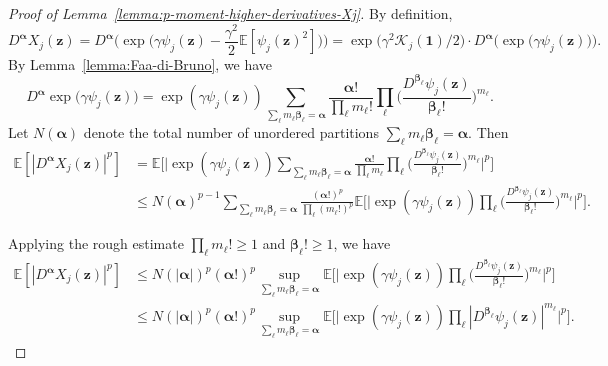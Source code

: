 \documentclass[12pt]{amsart}
\theoremstyle{definition}
\theoremstyle{remark}
\newcommand{\bz}{\boldsymbol{z}}
\newcommand{\E}{\mathbb{E}}
\numberwithin{equation}{section}
\begin{document}
\begin{proof}[Proof of Lemma~\ref{lemma:p-moment-higher-derivatives-Xj}]
By definition,
\[
D^{\boldsymbol{\alpha}} X_j(\bz)=D^{\boldsymbol{\alpha}}\Big(\exp\big(\gamma \psi_j(\bz)-\frac{\gamma^2}{2}\E[\psi_j(\bz)^2]\big)\Big)=\exp\big(\gamma^2 \mathcal{K}_j(\boldsymbol{1})/2\big)\cdot D^{\boldsymbol{\alpha}}\Big(\exp\big(\gamma\psi_j(\bz)\big)\Big).
\]
By Lemma~\ref{lemma:Faa-di-Bruno}, we have
\[
D^{\boldsymbol{\alpha}}\exp\big(\gamma \psi_j(\bz)\big)=\exp(\gamma\psi_j(\bz))\sum_{\sum_\ell m_\ell\boldsymbol{\beta}_\ell=\boldsymbol{\alpha}} \frac{\boldsymbol{\alpha}!}{\prod_\ell m_\ell!} \prod_\ell \bigg(\frac{D^{\boldsymbol{\beta}_\ell}\psi_j(\bz)}{\boldsymbol{\beta}_\ell!}\bigg)^{m_\ell}.
\]
Let $N(\boldsymbol{\alpha})$ denote the total number of unordered partitions $\sum_\ell m_\ell \boldsymbol{\beta}_\ell=\boldsymbol{\alpha}$. Then
\begin{align*}
\E[|D^{\boldsymbol{\alpha}}X_j(\bz)|^p]&=\E\bigg[\bigg|\exp(\gamma\psi_j(\bz))\sum_{\sum_\ell m_\ell\boldsymbol{\beta}_\ell=\boldsymbol{\alpha}}\frac{\boldsymbol{\alpha}!}{\prod_\ell m_\ell}\prod_\ell \bigg(\frac{D^{\boldsymbol{\beta}_\ell}\psi_j(\bz)}{\boldsymbol{\beta}_\ell!}\bigg)^{m_\ell}\bigg|^p\bigg]\\
&\le N(\boldsymbol{\alpha})^{p-1}\sum_{\sum_\ell m_\ell \boldsymbol{\beta}_\ell=\boldsymbol{\alpha}}\frac{(\boldsymbol{\alpha}!)^p}{\prod_\ell (m_\ell!)^p} \E\bigg[\bigg|\exp(\gamma\psi_j(\bz))\prod_{\ell} \bigg(\frac{D^{\boldsymbol{\beta}_\ell}\psi_j(\bz)}{\boldsymbol{\beta}_\ell!}\bigg)^{m_\ell}\bigg|^p\bigg].
\end{align*}


Applying the rough estimate $\prod_\ell m_\ell!\ge 1$ and $\boldsymbol{\beta}_\ell!\ge 1$, we have
\begin{align*}
\E[|D^{\boldsymbol{\alpha}}X_j(\bz)|^p]&\le N(|\boldsymbol{\alpha}|)^p (\boldsymbol{\alpha}!)^p \sup_{\sum_\ell m_\ell \boldsymbol{\beta}_\ell=\boldsymbol{\alpha}} \E\bigg[\bigg|\exp(\gamma\psi_j(\bz))\prod_{\ell} \bigg(\frac{D^{\boldsymbol{\beta}_\ell}\psi_j(\bz)}{\boldsymbol{\beta}_\ell!}\bigg)^{m_\ell}\bigg|^p\bigg]\\
&\le N(|\boldsymbol{\alpha}|)^p (\boldsymbol{\alpha}!)^p \sup_{\sum_\ell m_\ell \boldsymbol{\beta}_\ell=\boldsymbol{\alpha}} \E\Big[\big|\exp(\gamma\psi_j(\bz))\prod_{\ell} |D^{\boldsymbol{\beta}_\ell}\psi_j(\bz)|^{m_\ell}\big|^p\Big].
\end{align*}


\end{proof}
\end{document}
